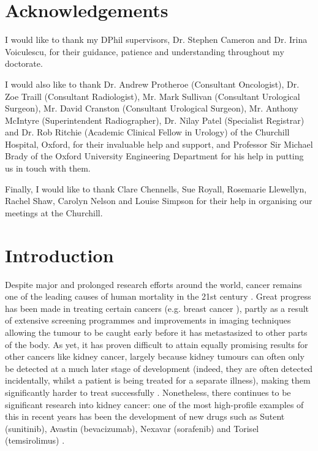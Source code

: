 \chapter*{Acknowledgements}

\thispagestyle{empty} %

I would like to thank my DPhil supervisors, Dr. Stephen Cameron and Dr. Irina Voiculescu, for their guidance, patience and understanding throughout my doctorate.

I would also like to thank Dr. Andrew Protheroe (Consultant Oncologist), Dr. Zoe Traill (Consultant Radiologist), Mr. Mark Sullivan (Consultant Urological Surgeon), Mr. David Cranston (Consultant Urological Surgeon), Mr. Anthony McIntyre (Superintendent Radiographer), Dr. Nilay Patel (Specialist Registrar) and Dr. Rob Ritchie (Academic Clinical Fellow in Urology) of the Churchill Hospital, Oxford, for their invaluable help and support, and Professor Sir Michael Brady of the Oxford University Engineering Department for his help in putting us in touch with them.

Finally, I would like to thank Clare Chennells, Sue Royall, Rosemarie Llewellyn, Rachel Shaw, Carolyn Nelson and Louise Simpson for their help in organising our meetings at the Churchill.

\chapter{Introduction}

\setcounter{page}{1} %


Despite major and prolonged research efforts around the world, cancer remains one of the leading causes of human mortality in the 21st century \cite{?}. Great progress has been made in treating certain cancers (e.g. breast cancer \cite{?}), partly as a result of extensive screening programmes and improvements in imaging techniques allowing the tumour to be caught early before it has metastasized to other parts of the body. As yet, it has proven difficult to attain equally promising results for other cancers like kidney cancer, largely because kidney tumours can often only be detected at a much later stage of development (indeed, they are often detected incidentally, whilst a patient is being treated for a separate illness), making them significantly harder to treat successfully \cite{?}. Nonetheless, there continues to be significant research into kidney cancer: one of the most high-profile examples of this in recent years has been the development of new drugs such as Sutent (sunitinib), Avastin (bevacizumab), Nexavar (sorafenib) and Torisel (temsirolimus) \cite{?}.

